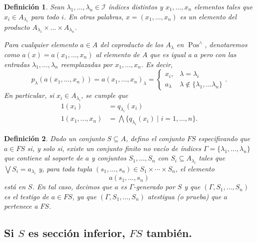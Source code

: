 \documentclass[12pt,letterpaper,titlepage]{article}
\newtheorem*{defn}{Definición}
\theoremstyle{definition}
\newcommand\Sup{\bigvee}
\renewcommand\inf{\wedge}
\newcommand\Inf{\bigwedge}
\newcommand\scr[1]{\mathscr{#1}}
\newcommand\tps[1]{\texorpdfstring{#1}{}}
\newcommand\<{\langle}
\renewcommand\>{\rangle}
\DeclareMathOperator{\Pos}{Pos}
\begin{document}
\begin{defn}
Sean $\lambda_1,\dots,\lambda_n\in \scr I$ índices distintos y
$x_1,\dots,x_n$ elementos tales que
$x_i\in A_{\lambda_i}$ para todo $i$.
En otras palabras, $x=(x_1,\dots,x_n)$ es un elemento del producto
$A_{\lambda_1}\times\dots\times A_{\lambda_n}$.

Para cualquier elemento $a\in A$ del coproducto de los $A_\lambda$
en $\Pos^\inf$, denotaremos como
$a(x)=a(x_1,\dots,x_n)$ al elemento de $A$ que
es igual a $a$ pero con las entradas $\lambda_1,\dots,\lambda_n$
reemplazadas por $x_1,\dots,x_n$.
Es decir,
\[
    p_\lambda(a(x_1,\dots,x_n))
    =
    a(x_1,\dots,x_n)_\lambda
    =
    \begin{cases}
        x_i, & \lambda = \lambda_i \\
        a_\lambda & \lambda\not\in\{\lambda_1,\dots\lambda_n\}
    \end{cases}
.\]
En particular, si $x_i\in A_{\lambda_i}$, se cumple que
\begin{align*}
  1(x_i)
    &= q_{\lambda_i}(x_i) \\
  1(x_1,\dots,x_n)
    &= \Inf\{q_{\lambda_i}(x_i) \mid i=1,\dots,n\}.
\end{align*}
%
\end{defn}

\begin{defn}
  Dado un conjunto $S\subseteq A$, defino el conjunto $FS$
  especifivando que $a\in FS$ si, y solo si,
  existe un conjunto finito no vacío de índices
  $\Gamma=\{\lambda_1,\dots,\lambda_n\}$ que contiene al
  soporte de $a$ y conjuntos $S_1,\dots,S_n$ con
  $S_i\subseteq A_{\lambda_i}$ tales que $\Sup S_i =
  a_{\lambda_i}$ y, para toda tupla
  $(s_1,\dots,s_n)\in S_1\times\cdots\times S_n$, el elemento
  \[
    a(s_1,\dots,s_n)
  \]
  está en $S$.
  En tal caso, decimos que $a$ es $\Gamma$-generado por $S$ y
  que $(\Gamma,S_1,\dots,S_n)$ es el testigo de $a\in FS$,
  ya que $(\Gamma,S_1,\dots,S_n)$ atestigua (o prueba) que
  $a$ pertenece a $FS$.
\end{defn}

\subsection{Si \tps{$S$} es sección inferior, \tps{$FS$} también.}
\end{document}
